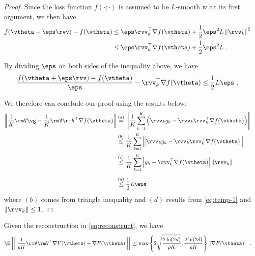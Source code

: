 \begin{proof}
Since the loss function $f(\cdot;\cdot)$ is assumed to be $L$-smooth w.r.t its first argument, we then have
\begin{equation}
\begin{aligned}
f(\vtheta + \eps \rvv) - f(\vtheta) &\leq \eps \rvv_k^{\top}\nabla f(\vtheta) + \frac{1}{2}\eps^2 L\left\|\rvv_k\right\|^2 \\
&\leq \eps \rvv_k^{\top}\nabla f(\vtheta) + \frac{1}{2}\eps^2 L \ .
\end{aligned}
\end{equation}

By dividing $\eps$ on both sides of the inequality above, we have
\begin{equation}
\begin{aligned}
\frac{f(\vtheta + \eps \rvv) - f(\vtheta)}{\eps} -\rvv_k^{\top}\nabla f(\vtheta)  \leq \frac{1}{2} L\eps \ . \label{eq:temp-1}
\end{aligned}
\end{equation}

We therefore can conclude our proof using the results below:
\begin{equation}
\begin{aligned}
\left\|\frac{1}{K}\rmV\vg - \frac{1}{K}\rmV\rmV^{\top} \nabla f(\vtheta)\right\| &\stackrel{(a)}{=} \left\|\frac{1}{K}\sum_{k=1}^K \left(\rvv_k g_k - \rvv_k\rvv_k^{\top} \nabla f(\vtheta)\right)\right\| \\
&\stackrel{(b)}{\leq} \frac{1}{K}\sum_{k=1}^K \left\|\rvv_k g_k - \rvv_k\rvv_k^{\top} \nabla f(\vtheta)\right\| \\
&\stackrel{(c)}{\leq} \frac{1}{K}\sum_{k=1}^K \left|g_k - \rvv_k^{\top} \nabla f(\vtheta)\right|\left\|\rvv_k\right\| \\[5pt]
&\stackrel{(d)}{\leq} \frac{1}{2}L \eps
\end{aligned}
\end{equation}
where $(b)$ comes from triangle inequality and $(d)$ results from \eqref{eq:temp-1} and $\left\|\rvv_k\right\| \leq 1$.
\end{proof}

\begin{lemma}\label{thm:reconstruct-error}
Given the reconstruction in \eqref{eq:reconstruct}, we have
\begin{equation*}
\E\left[\left\|\frac{1}{\rho K}\rmV\rmV^{\top} \nabla F(\vtheta) - \nabla F(\vtheta)\right\|\right] \leq \max\left\{2\sqrt{\frac{2\ln(2d)}{\rho K}}, \frac{2\ln(2d)}{\rho K}\right\} \left\|\nabla F(\vtheta)\right\| \ .
\end{equation*}
\end{lemma}

